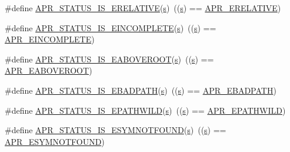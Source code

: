 \begin{DoxyCompactItemize}
\item 
\#define \hyperlink{group__APR__STATUS__IS_ga7a8fca5102890e9a0bc4133ba848d52c}{A\+P\+R\+\_\+\+S\+T\+A\+T\+U\+S\+\_\+\+I\+S\+\_\+\+E\+R\+E\+L\+A\+T\+I\+VE}(\hyperlink{pcretest_8txt_a062597889ba244b72877454b1d3adecf}{s})~((\hyperlink{pcretest_8txt_a062597889ba244b72877454b1d3adecf}{s}) == \hyperlink{group__APR__Error_gae4688dfa866265b9ec3623689c23923b}{A\+P\+R\+\_\+\+E\+R\+E\+L\+A\+T\+I\+VE})
\item 
\#define \hyperlink{group__APR__STATUS__IS_gae7354f40a912dc43fe76ba2a59de0403}{A\+P\+R\+\_\+\+S\+T\+A\+T\+U\+S\+\_\+\+I\+S\+\_\+\+E\+I\+N\+C\+O\+M\+P\+L\+E\+TE}(\hyperlink{pcretest_8txt_a062597889ba244b72877454b1d3adecf}{s})~((\hyperlink{pcretest_8txt_a062597889ba244b72877454b1d3adecf}{s}) == \hyperlink{group__APR__Error_gab4357bcbdc2922183e0594865b59ce58}{A\+P\+R\+\_\+\+E\+I\+N\+C\+O\+M\+P\+L\+E\+TE})
\item 
\#define \hyperlink{group__APR__STATUS__IS_gae89b8de1e40b855cf95987ce5947b442}{A\+P\+R\+\_\+\+S\+T\+A\+T\+U\+S\+\_\+\+I\+S\+\_\+\+E\+A\+B\+O\+V\+E\+R\+O\+OT}(\hyperlink{pcretest_8txt_a062597889ba244b72877454b1d3adecf}{s})~((\hyperlink{pcretest_8txt_a062597889ba244b72877454b1d3adecf}{s}) == \hyperlink{group__APR__Error_ga4828cc04f97dc7bed691456adf7c073e}{A\+P\+R\+\_\+\+E\+A\+B\+O\+V\+E\+R\+O\+OT})
\item 
\#define \hyperlink{group__APR__STATUS__IS_ga0758d7227209e4311c843c752c0dd075}{A\+P\+R\+\_\+\+S\+T\+A\+T\+U\+S\+\_\+\+I\+S\+\_\+\+E\+B\+A\+D\+P\+A\+TH}(\hyperlink{pcretest_8txt_a062597889ba244b72877454b1d3adecf}{s})~((\hyperlink{pcretest_8txt_a062597889ba244b72877454b1d3adecf}{s}) == \hyperlink{group__APR__Error_ga1731292eb3e3cdc801d3bf0b09cd8da7}{A\+P\+R\+\_\+\+E\+B\+A\+D\+P\+A\+TH})
\item 
\#define \hyperlink{group__APR__STATUS__IS_gae23aedf7ad4e6a111ffd6acf4167b00e}{A\+P\+R\+\_\+\+S\+T\+A\+T\+U\+S\+\_\+\+I\+S\+\_\+\+E\+P\+A\+T\+H\+W\+I\+LD}(\hyperlink{pcretest_8txt_a062597889ba244b72877454b1d3adecf}{s})~((\hyperlink{pcretest_8txt_a062597889ba244b72877454b1d3adecf}{s}) == \hyperlink{group__APR__Error_ga01d0fb965051103b5c8f15a43ad2c767}{A\+P\+R\+\_\+\+E\+P\+A\+T\+H\+W\+I\+LD})
\item 
\#define \hyperlink{group__APR__STATUS__IS_gafab6c5fe2f9b906d533d253097a16e09}{A\+P\+R\+\_\+\+S\+T\+A\+T\+U\+S\+\_\+\+I\+S\+\_\+\+E\+S\+Y\+M\+N\+O\+T\+F\+O\+U\+ND}(\hyperlink{pcretest_8txt_a062597889ba244b72877454b1d3adecf}{s})~((\hyperlink{pcretest_8txt_a062597889ba244b72877454b1d3adecf}{s}) == \hyperlink{group__APR__Error_ga8d96410fc32408160e1e85e2e96402fa}{A\+P\+R\+\_\+\+E\+S\+Y\+M\+N\+O\+T\+F\+O\+U\+ND})

\end{DoxyCompactItemize}
